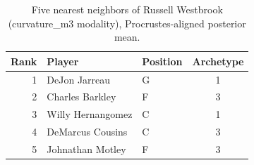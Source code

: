 \begin{table}[htbp]
  \centering\small
  \begin{tabular}{rllc}
    \toprule
    Rank & Player & Position & Archetype \\
    \midrule
    1 & DeJon Jarreau & G & 1 \\
    2 & Charles Barkley & F & 3 \\
    3 & Willy Hernangomez & C & 1 \\
    4 & DeMarcus Cousins & C & 3 \\
    5 & Johnathan Motley & F & 3 \\
    \bottomrule
  \end{tabular}
  \caption{Five nearest neighbors of Russell Westbrook (curvature_m3 modality), Procrustes-aligned posterior mean.}
  \label{tab:Russell_Westbrook_neighbors_curvature_m3}
\end{table}

